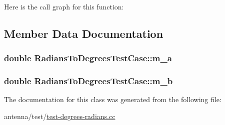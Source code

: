 Here is the call graph for this function\+:




\subsection{Member Data Documentation}
\subsubsection[{\texorpdfstring{m\+\_\+a}{m_a}}]{\setlength{\rightskip}{0pt plus 5cm}double Radians\+To\+Degrees\+Test\+Case\+::m\+\_\+a\hspace{0.3cm}{\ttfamily [private]}}\hypertarget{classRadiansToDegreesTestCase_a895d73fe5bd1f62c14bc27b8fccf3c80}{}\label{classRadiansToDegreesTestCase_a895d73fe5bd1f62c14bc27b8fccf3c80}
\subsubsection[{\texorpdfstring{m\+\_\+b}{m_b}}]{\setlength{\rightskip}{0pt plus 5cm}double Radians\+To\+Degrees\+Test\+Case\+::m\+\_\+b\hspace{0.3cm}{\ttfamily [private]}}\hypertarget{classRadiansToDegreesTestCase_af5855c27ab691f809ff4ed96cb8eff8a}{}\label{classRadiansToDegreesTestCase_af5855c27ab691f809ff4ed96cb8eff8a}


The documentation for this class was generated from the following file\+:\begin{DoxyCompactItemize}
\item 
antenna/test/\hyperlink{test-degrees-radians_8cc}{test-\/degrees-\/radians.\+cc}\end{DoxyCompactItemize}
